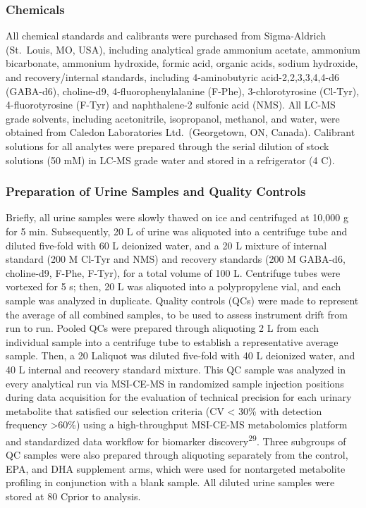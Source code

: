 \documentclass[journal=jacsat,manuscript=article]{achemso}
\begin{document}
\subsubsection{Chemicals}\label{chemicals}

All chemical standards and calibrants were purchased from Sigma-Aldrich
(St.~Louis, MO, USA), including analytical grade ammonium acetate,
ammonium bicarbonate, ammonium hydroxide, formic acid, organic acids,
sodium hydroxide, and recovery/internal standards, including
4-aminobutyric acid-2,2,3,3,4,4-d6 (GABA-d6), choline-d9,
4-fluorophenylalanine (F-Phe), 3-chlorotyrosine (Cl-Tyr),
4-fluorotyrosine (F-Tyr) and naphthalene-2 sulfonic acid (NMS). All
LC-MS grade solvents, including acetonitrile, isopropanol, methanol, and
water, were obtained from Caledon Laboratories Ltd.~(Georgetown, ON,
Canada). Calibrant solutions for all analytes were prepared through the
serial dilution of stock solutions (50 mM) in LC-MS grade water and
stored in a refrigerator (4 C).

\subsubsection{Preparation of Urine Samples and Quality
Controls}\label{preparation-of-urine-samples-and-quality-controls}

Briefly, all urine samples were slowly thawed on ice and centrifuged at
10,000 g for 5 min. Subsequently, 20 L of urine was aliquoted into a
centrifuge tube and diluted five-fold with 60 L deionized water, and a
20 L mixture of internal standard (200 M Cl-Tyr and NMS) and recovery
standards (200 M GABA-d6, choline-d9, F-Phe, F-Tyr), for a total volume
of 100 L. Centrifuge tubes were vortexed for 5 s; then, 20 L was
aliquoted into a polypropylene vial, and each sample was analyzed in
duplicate. Quality controls (QCs) were made to represent the average of
all combined samples, to be used to assess instrument drift from run to
run. Pooled QCs were prepared through aliquoting 2 L from each
individual sample into a centrifuge tube to establish a representative
average sample. Then, a 20 Laliquot was diluted five-fold with 40 L
deionized water, and 40 L internal and recovery standard mixture. This
QC sample was analyzed in every analytical run via MSI-CE-MS in
randomized sample injection positions during data acquisition for the
evaluation of technical precision for each urinary metabolite that
satisfied our selection criteria (CV \textless{} 30\% with detection
frequency \textgreater60\%) using a high-throughput MSI-CE-MS
metabolomics platform and standardized data workflow for biomarker
discovery\textsuperscript{29}. Three subgroups of QC samples were also
prepared through aliquoting separately from the control, EPA, and DHA
supplement arms, which were used for nontargeted metabolite profiling in
conjunction with a blank sample. All diluted urine samples were stored
at 80 Cprior to analysis.
\end{document}
